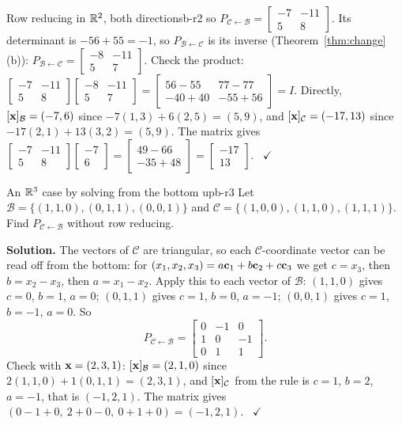 \documentclass[11pt]{article}
\begin{document}
\begin{exmp}{Row reducing in $\mathbb{R}^2$, both directions}{b-r2}
so $P_{\mathcal{C}\leftarrow\mathcal{B}}=\begin{bmatrix}-7&-11\\5&8\end{bmatrix}$. Its determinant is $-56+55=-1$, so $P_{\mathcal{B}\leftarrow\mathcal{C}}$ is its inverse (Theorem~\ref{thm:change}(b)): $P_{\mathcal{B}\leftarrow\mathcal{C}}=\begin{bmatrix}-8&-11\\5&7\end{bmatrix}$. Check the product: $\begin{bmatrix}-7&-11\\5&8\end{bmatrix}\begin{bmatrix}-8&-11\\5&7\end{bmatrix}=\begin{bmatrix}56-55&77-77\\-40+40&-55+56\end{bmatrix}=I$. Directly, $[\mathbf{x}]_{\mathcal{B}}=(-7,6)$ since $-7(1,3)+6(2,5)=(5,9)$, and $[\mathbf{x}]_{\mathcal{C}}=(-17,13)$ since $-17(2,1)+13(3,2)=(5,9)$. The matrix gives $\begin{bmatrix}-7&-11\\5&8\end{bmatrix}\begin{bmatrix}-7\\6\end{bmatrix}=\begin{bmatrix}49-66\\-35+48\end{bmatrix}=\begin{bmatrix}-17\\13\end{bmatrix}$. \ $\checkmark$
\end{exmp}

\begin{exmp}{An $\mathbb{R}^3$ case by solving from the bottom up}{b-r3}
Let $\mathcal{B}=\{(1,1,0),(0,1,1),(0,0,1)\}$ and $\mathcal{C}=\{(1,0,0),(1,1,0),(1,1,1)\}$. Find $P_{\mathcal{C}\leftarrow\mathcal{B}}$ without row reducing.

\textbf{Solution.} The vectors of $\mathcal{C}$ are triangular, so each $\mathcal{C}$-coordinate vector can be read off from the bottom: for $(x_1,x_2,x_3)=a\mathbf{c}_1+b\mathbf{c}_2+c\mathbf{c}_3$ we get $c=x_3$, then $b=x_2-x_3$, then $a=x_1-x_2$. Apply this to each vector of $\mathcal{B}$: $(1,1,0)$ gives $c=0$, $b=1$, $a=0$; $(0,1,1)$ gives $c=1$, $b=0$, $a=-1$; $(0,0,1)$ gives $c=1$, $b=-1$, $a=0$. So
\[
P_{\mathcal{C}\leftarrow\mathcal{B}}=\begin{bmatrix}0&-1&0\\1&0&-1\\0&1&1\end{bmatrix}.
\]
Check with $\mathbf{x}=(2,3,1)$: $[\mathbf{x}]_{\mathcal{B}}=(2,1,0)$ since $2(1,1,0)+1(0,1,1)=(2,3,1)$, and $[\mathbf{x}]_{\mathcal{C}}$ from the rule is $c=1$, $b=2$, $a=-1$, that is $(-1,2,1)$. The matrix gives $(0-1+0,\ 2+0-0,\ 0+1+0)=(-1,2,1)$. \ $\checkmark$
\end{exmp}
\end{document}
